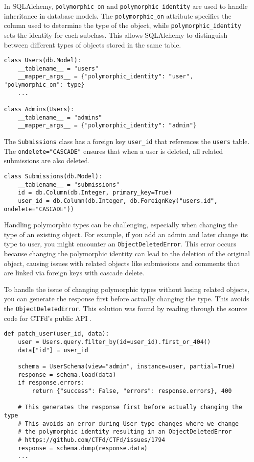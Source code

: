 In SQLAlchemy, \texttt{polymorphic\_on} and \texttt{polymorphic\_identity} are used to handle inheritance in database models. The \texttt{polymorphic\_on} attribute specifies the column used to determine the type of the object, while \texttt{polymorphic\_identity} sets the identity for each subclass. This allows SQLAlchemy to distinguish between different types of objects stored in the same table.

\begin{verbatim}
class Users(db.Model):
    __tablename__ = "users"
    __mapper_args__ = {"polymorphic_identity": "user", "polymorphic_on": type}
    ...

class Admins(Users):
    __tablename__ = "admins"
    __mapper_args__ = {"polymorphic_identity": "admin"}
\end{verbatim}

The \texttt{Submissions} class has a foreign key \texttt{user\_id} that references the \texttt{users} table. The \texttt{ondelete="CASCADE"} ensures that when a user is deleted, all related submissions are also deleted.

\begin{verbatim}
class Submissions(db.Model):
    __tablename__ = "submissions"
    id = db.Column(db.Integer, primary_key=True)
    user_id = db.Column(db.Integer, db.ForeignKey("users.id", ondelete="CASCADE"))
\end{verbatim}

Handling polymorphic types can be challenging, especially when changing the type of an existing object. For example, if you add an admin and later change its type to user, you might encounter an \texttt{ObjectDeletedError}. This error occurs because changing the polymorphic identity can lead to the deletion of the original object, causing issues with related objects like submissions and comments that are linked via foreign keys with cascade delete.

To handle the issue of changing polymorphic types without losing related objects, you can generate the response first before actually changing the type. This avoids the \texttt{ObjectDeletedError}. This solution was found by reading through the source code for CTFd's public API \cite{CTFdUsersAPI}.

\begin{verbatim}
def patch_user(user_id, data):
    user = Users.query.filter_by(id=user_id).first_or_404()
    data["id"] = user_id

    schema = UserSchema(view="admin", instance=user, partial=True)
    response = schema.load(data)
    if response.errors:
        return {"success": False, "errors": response.errors}, 400

    # This generates the response first before actually changing the type
    # This avoids an error during User type changes where we change
    # the polymorphic identity resulting in an ObjectDeletedError
    # https://github.com/CTFd/CTFd/issues/1794
    response = schema.dump(response.data)
    ...
\end{verbatim}

